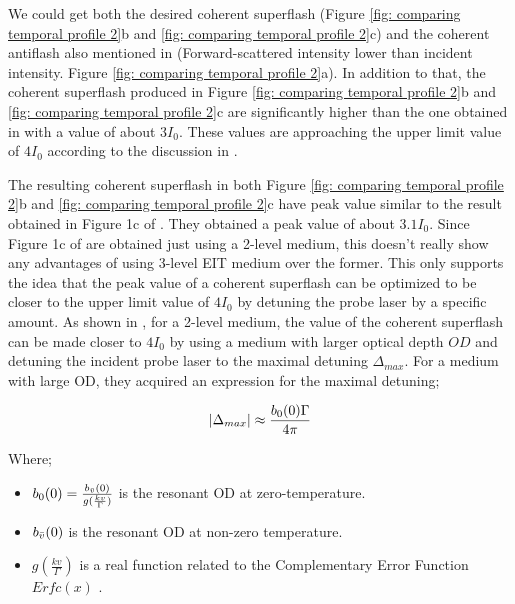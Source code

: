 We could get both the desired coherent superflash (Figure \ref{fig: comparing temporal profile 2}b and \ref{fig: comparing temporal profile 2}c) and the coherent antiflash also mentioned in \cite{Kwong2017} (Forward-scattered intensity lower than incident intensity. Figure \ref{fig: comparing temporal profile 2}a). In addition to that, the coherent superflash produced in Figure \ref{fig: comparing temporal profile 2}b and \ref{fig: comparing temporal profile 2}c are significantly higher than the one obtained in \cite{jeong2010slow} with a value of about $3I_{0}$. These values are approaching the upper limit value of $4I_{0}$ according to the discussion in \cite{Kwong2014}.

The resulting coherent superflash in both Figure \ref{fig: comparing temporal profile 2}b and \ref{fig: comparing temporal profile 2}c have peak value similar to the result obtained in Figure 1c of \cite{Kwong2014}. They obtained a peak value of about $3.1 I_{0}$. Since Figure 1c of \cite{Kwong2014} are obtained just using a 2-level medium, this doesn't really show any advantages of using 3-level EIT medium over the former. This only supports the idea that the peak value of a coherent superflash can be optimized to be closer to the upper limit value of $4I_{0}$ by detuning the probe laser by a specific amount. As shown in \cite{Kwong2014}, for a 2-level medium, the value of the coherent superflash can be made closer to $4I_{0}$ by using a medium with larger optical depth $OD$ and detuning the incident probe laser to the maximal detuning $\Delta_{max}$. For a medium with large OD, they acquired an expression for the maximal detuning;

\begin{equation}
    \abs{\Delta_{max}} \approx \frac{b_{0}(0) \Gamma}{4\pi} 
\end{equation}

\newpage

Where;

\begin{itemize}
    \item $b_{0}(0) = \frac{b_{\Bar{v}}(0)}{g(\frac{kv}{\Gamma})}$ is the resonant OD at zero-temperature. 
    \item $b_{\Bar{v}}(0)$ is the resonant OD at non-zero temperature.
    \item $g(\frac{kv}{\Gamma})$ is a real function related to the Complementary Error Function $Erfc(x)$ \cite{abramowitz1965ia}.
\end{itemize}

